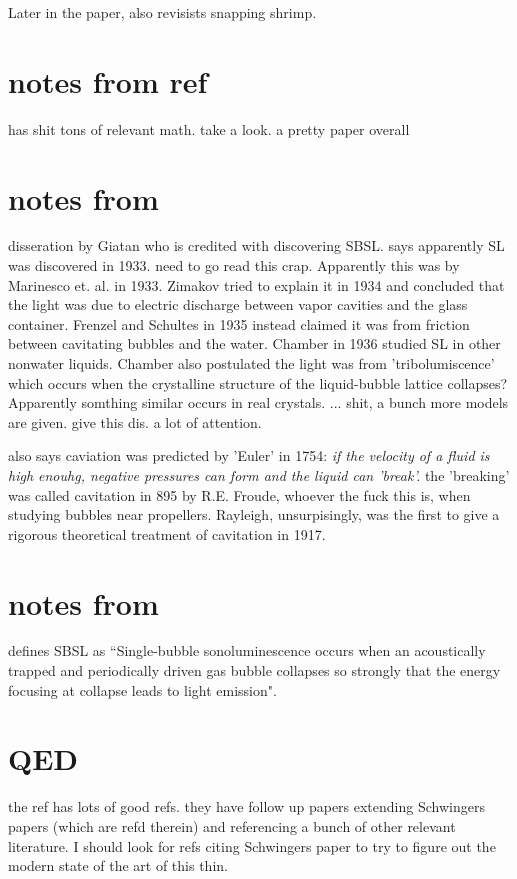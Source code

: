 \documentclass[rmp,aps,nofootinbib,superscriptaddress,floatfix]{revtex4-2}
\begin{document}
Later in the paper, also revisists snapping shrimp.

\section{notes from ref \cite{prosperetti2004bubbles}}
has shit tons of relevant math. take a look. a pretty paper overall


\section{notes from \cite{gaitan1990experimental}}
disseration by Giatan who is credited with discovering SBSL. says apparently SL was discovered in 1933. need to go read this crap. Apparently this was by Marinesco et. al. in 1933. Zimakov tried to explain it in 1934 and concluded that the light was due to electric discharge between vapor cavities and the glass container. Frenzel and Schultes in 1935 instead claimed it was from friction between cavitating bubbles and the water. Chamber in 1936 studied SL in other nonwater liquids. Chamber also postulated the light was from 'tribolumiscence' which occurs when the crystalline structure of the liquid-bubble lattice collapses? Apparently somthing similar occurs in real crystals. ... shit, a bunch more models are given. give this dis. a lot of attention.

also says caviation was predicted by 'Euler' in 1754: \emph{if the velocity of a fluid is high enouhg, negative pressures can form and the liquid can 'break'.} the 'breaking' was called cavitation in 895 by R.E. Froude, whoever the fuck this is, when studying bubbles near propellers. Rayleigh, unsurpisingly, was the first to give a rigorous theoretical treatment of cavitation in 1917.

\section{notes from \cite{brenner2002single}}
defines SBSL as ``Single-bubble sonoluminescence occurs when an acoustically trapped and periodically driven gas bubble collapses so strongly that the energy focusing at collapse leads to light emission". 

\section{QED}
the ref \cite{liberati2000sonoluminescence} has lots of good refs. they have follow up papers extending Schwingers papers (which are refd therein) and referencing a bunch of other relevant literature. I should look for refs citing Schwingers paper to try to figure out the modern state of the art of this thin.
\end{document}
